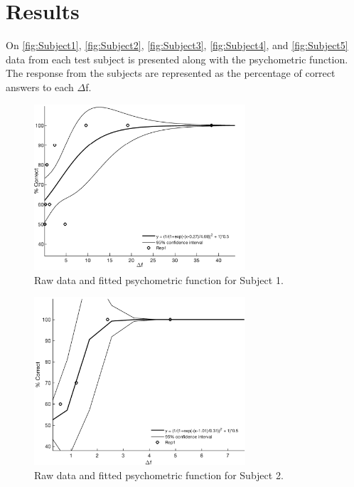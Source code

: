 \section*{Results}
%
On \autoref{fig:Subject1}, \autoref{fig:Subject2}, \autoref{fig:Subject3}, \autoref{fig:Subject4}, and \autoref{fig:Subject5} data from each test subject is presented along with the psychometric function. The response from the subjects are represented as the percentage of correct answers to each $\Delta$f.
% 
\begin{figure}[htb]
\centering
\includegraphics[width = 0.7\textwidth]{Figure/Vores_Figurer/Subject1.png} 
\caption{Raw data and fitted psychometric function for Subject 1.}
\label{fig:Subject1}
\end{figure}
%
\begin{figure}[htb]
\centering
\includegraphics[width = 0.7\textwidth]{Figure/Vores_Figurer/Subject2.png} 
\caption{Raw data and fitted psychometric function for Subject 2.}
\label{fig:Subject2}
\end{figure}
%
